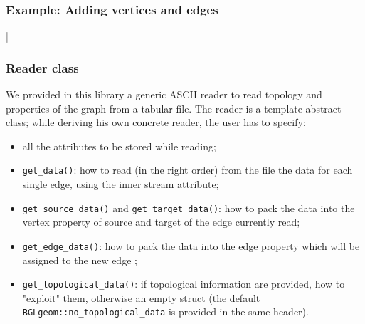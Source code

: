 \documentclass[11pt]{beamer}
\begin{document}
	
	\begin{frame}
	\frametitle{Example: Adding vertices and edges}
	\lstIII|
	\end{frame}

	\begin{frame}
	\lstIIII
	\end{frame}
	
	\begin{frame}
		\frametitle{Reader class}
		We provided in this library a generic ASCII reader to read topology and properties of the graph from a tabular file. The reader is a template abstract class; while deriving his own concrete reader, the user has to specify:
		\begin{itemize}
			\item all the attributes to be stored while reading;
			\item \texttt{get\_data()}: how to read (in the right order) from the file the data for each single edge, using the inner stream attribute;
			\item \texttt{get\_source\_data()} and \texttt{get\_target\_data()}: how to pack the data into the vertex property of source and target of the edge currently read;
			\item \texttt{get\_edge\_data()}: how to pack the data into the edge property which will be assigned to the new edge ;
			\item \texttt{get\_topological\_data()}: if topological information are provided, how to "exploit" them, otherwise an empty struct (the default \texttt{BGLgeom::no\_topological\_data} is provided in the same header).
		\end{itemize}
	\end{frame}
	
\end{document}
